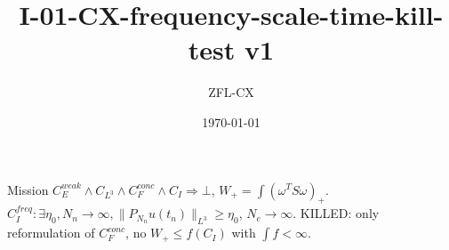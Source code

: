 \documentclass[11pt]{article}
\begin{document}
\title{I-01-CX-frequency-scale-time-kill-test v1}\author{ZFL-CX}\date{\today}\maketitle
Mission $\boxed{C_E^{weak}\land C_{L^3}\land C_F^{conc}\land C_I\Rightarrow\bot}$, $W_+=\int(\omega^TS\omega)_+$.
$C_I^{freq}: \exists\eta_0,N_n\to\infty,\|P_{N_n}u(t_n)\|_{L^3}\ge\eta_0$, $N_c\to\infty$. KILLED: only reformulation of $C_F^{conc}$, no $W_+\le f(C_I)$ with $\int f<\infty$.
\end{document}
